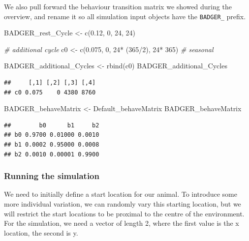 \documentclass[10pt,a4paper]{article}
\newenvironment{Shaded}{}{}
\newcommand{\CommentTok}[1]{\textit{#1}}
\newcommand{\DecValTok}[1]{#1}
\newcommand{\FloatTok}[1]{#1}
\newcommand{\FunctionTok}[1]{#1}
\newcommand{\NormalTok}[1]{#1}
\newcommand{\OtherTok}[1]{#1}
\newcommand{\SpecialCharTok}[1]{#1}
\begin{document}
We also pull forward the behaviour transition matrix we showed during the overview, and rename it so all simulation input objects have the \texttt{BADGER\_} prefix.

\begin{Shaded}
\begin{Highlighting}[]
\NormalTok{BADGER\_rest\_Cycle }\OtherTok{\textless{}{-}} \FunctionTok{c}\NormalTok{(}\FloatTok{0.12}\NormalTok{, }\DecValTok{0}\NormalTok{, }\DecValTok{24}\NormalTok{, }\DecValTok{24}\NormalTok{)}

\CommentTok{\# additional cycle}
\NormalTok{c0 }\OtherTok{\textless{}{-}} \FunctionTok{c}\NormalTok{(}\FloatTok{0.075}\NormalTok{, }\DecValTok{0}\NormalTok{, }\DecValTok{24}\SpecialCharTok{*}\NormalTok{ (}\DecValTok{365}\SpecialCharTok{/}\DecValTok{2}\NormalTok{), }\DecValTok{24}\SpecialCharTok{*} \DecValTok{365}\NormalTok{) }\CommentTok{\# seasonal}

\NormalTok{BADGER\_additional\_Cycles }\OtherTok{\textless{}{-}} \FunctionTok{rbind}\NormalTok{(c0)}
\NormalTok{BADGER\_additional\_Cycles}
\end{Highlighting}
\end{Shaded}

\begin{verbatim}
##     [,1] [,2] [,3] [,4]
## c0 0.075    0 4380 8760
\end{verbatim}

\begin{Shaded}
\begin{Highlighting}[]
\NormalTok{BADGER\_behaveMatrix }\OtherTok{\textless{}{-}}\NormalTok{ Default\_behaveMatrix}
\NormalTok{BADGER\_behaveMatrix}
\end{Highlighting}
\end{Shaded}

\begin{verbatim}
##        b0      b1     b2
## b0 0.9700 0.01000 0.0010
## b1 0.0002 0.95000 0.0008
## b2 0.0010 0.00001 0.9900
\end{verbatim}

\hypertarget{running-the-simulation}{%
\subsubsection{Running the simulation}\label{running-the-simulation}}

We need to initially define a start location for our animal.
To introduce some more individual variation, we can randomly vary this starting location, but we will restrict the start locations to be proximal to the centre of the environment.
For the simulation, we need a vector of length 2, where the first value is the x location, the second is y.
\end{document}
